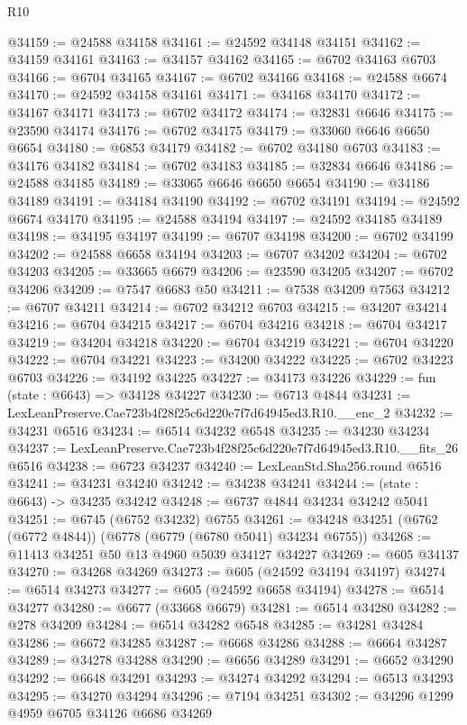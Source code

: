 \begin{lexlean}{R10}
\begin{coremodule}
@34159 := @24588 @34158
@34161 := @24592 @34148 @34151
@34162 := @34159 @34161
@34163 := @34157 @34162
@34165 := @6702 @34163 @6703
@34166 := @6704 @34165
@34167 := @6702 @34166
@34168 := @24588 @6674
@34170 := @24592 @34158 @34161
@34171 := @34168 @34170
@34172 := @34167 @34171
@34173 := @6702 @34172
@34174 := @32831 @6646
@34175 := @23590 @34174
@34176 := @6702 @34175
@34179 := @33060 @6646 @6650 @6654
@34180 := @6853 @34179
@34182 := @6702 @34180 @6703
@34183 := @34176 @34182
@34184 := @6702 @34183
@34185 := @32834 @6646
@34186 := @24588 @34185
@34189 := @33065 @6646 @6650 @6654
@34190 := @34186 @34189
@34191 := @34184 @34190
@34192 := @6702 @34191
@34194 := @24592 @6674 @34170
@34195 := @24588 @34194
@34197 := @24592 @34185 @34189
@34198 := @34195 @34197
@34199 := @6707 @34198
@34200 := @6702 @34199
@34202 := @24588 @6658 @34194
@34203 := @6707 @34202
@34204 := @6702 @34203
@34205 := @33665 @6679
@34206 := @23590 @34205
@34207 := @6702 @34206
@34209 := @7547 @6683 @50
@34211 := @7538 @34209 @7563
@34212 := @6707 @34211
@34214 := @6702 @34212 @6703
@34215 := @34207 @34214
@34216 := @6704 @34215
@34217 := @6704 @34216
@34218 := @6704 @34217
@34219 := @34204 @34218
@34220 := @6704 @34219
@34221 := @6704 @34220
@34222 := @6704 @34221
@34223 := @34200 @34222
@34225 := @6702 @34223 @6703
@34226 := @34192 @34225
@34227 := @34173 @34226
@34229 := fun (state : @6643) => @34128 @34227
@34230 := @6713 @4844
@34231 := LexLeanPreserve.Cae723b4f28f25c6d220e7f7d64945ed3.R10.__enc_2
@34232 := @34231 @6516
@34234 := @6514 @34232 @6548
@34235 := @34230 @34234
@34237 := LexLeanPreserve.Cae723b4f28f25c6d220e7f7d64945ed3.R10.__fits_26 @6516
@34238 := @6723 @34237
@34240 := LexLeanStd.Sha256.round @6516
@34241 := @34231 @34240
@34242 := @34238 @34241
@34244 := (state : @6643) -> @34235 @34242
@34248 := @6737 @4844 @34234 @34242 @5041
@34251 := @6745 (@6752 @34232) @6755
@34261 := @34248 @34251 (@6762 (@6772 @4844)) (@6778 (@6779 (@6780 @5041) @34234 @6755))
@34268 := @11413 @34251 @50 @13 @4960 @5039 @34127 @34227
@34269 := @605 @34137
@34270 := @34268 @34269
@34273 := @605 (@24592 @34194 @34197)
@34274 := @6514 @34273
@34277 := @605 (@24592 @6658 @34194)
@34278 := @6514 @34277
@34280 := @6677 (@33668 @6679)
@34281 := @6514 @34280
@34282 := @278 @34209
@34284 := @6514 @34282 @6548
@34285 := @34281 @34284
@34286 := @6672 @34285
@34287 := @6668 @34286
@34288 := @6664 @34287
@34289 := @34278 @34288
@34290 := @6656 @34289
@34291 := @6652 @34290
@34292 := @6648 @34291
@34293 := @34274 @34292
@34294 := @6513 @34293
@34295 := @34270 @34294
@34296 := @7194 @34251
@34302 := @34296 @1299 @4959 @6705 @34126 @6686 @34269

\end{coremodule}
\end{lexlean}
